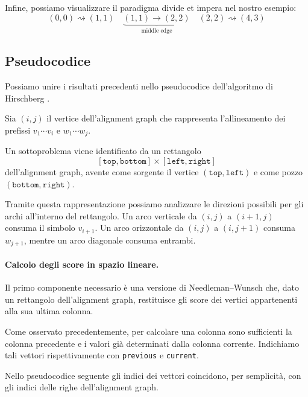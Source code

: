Infine, possiamo visualizzare il paradigma divide et impera nel nostro esempio:
\[
    (0,0)\rightsquigarrow(1,1)
    \quad
    \underbrace{(1,1)\rightarrow(2,2)}_{\text{middle edge}}
    \quad
    (2,2)\rightsquigarrow(4,3)
\]

\subsection{Pseudocodice}
\label{sec:H-pseudocodice}

Possiamo unire i risultati precedenti nello pseudocodice dell'algoritmo di Hirschberg \cite[pp.~269--276]{compeau--pevzner}.

Sia $(i,j)$ il vertice dell'alignment graph che rappresenta l'allineamento dei prefissi
$v_{1}\cdots  v_{i}$ e $w_{1}\cdots  w_{j}$.

Un sottoproblema viene identificato da un rettangolo
\[
    [\texttt{top},\texttt{bottom}]\times[\texttt{left},\texttt{right}]
\]
dell'alignment graph, avente come sorgente il vertice $(\texttt{top},\texttt{left})$ e
come pozzo $(\texttt{bottom},\texttt{right})$.

Tramite questa rappresentazione possiamo analizzare le direzioni possibili per gli archi
all'interno del rettangolo. Un arco verticale da $(i,j)$ a $(i+1,j)$ consuma il simbolo $v_{i+1}$.
Un arco orizzontale da $(i,j)$ a $(i,j+1)$ consuma $w_{j+1}$, mentre un arco diagonale consuma entrambi.

\paragraph{Calcolo degli score in spazio lineare.}

Il primo componente necessario è una versione di Needleman--Wunsch che, dato un rettangolo dell'alignment graph,
restituisce gli score dei vertici appartenenti alla sua ultima colonna.

Come osservato precedentemente, per calcolare una colonna sono sufficienti la colonna
precedente e i valori già determinati dalla colonna corrente. Indichiamo tali vettori rispettivamente 
con \texttt{previous} e \texttt{current}.

Nello pseudocodice seguente gli indici dei vettori coincidono, per semplicità, con gli
indici delle righe dell'alignment graph.

